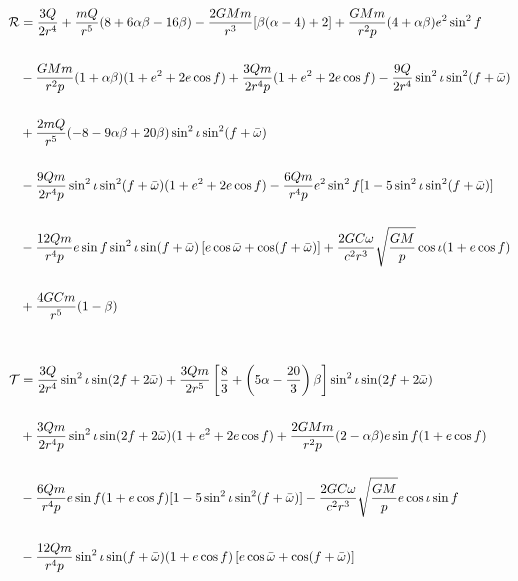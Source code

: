 \begin{align}
\begin{align*}
\mathcal{R} & =  \frac{3Q}{2r^4} +\frac{mQ}{r^5}(8+6\alpha\beta - 16\beta) - \frac{2GMm}{r^3}[\beta(\alpha - 4) + 2]+ \frac{GMm}{r^2p}(4+\alpha\beta) e^2 \sin^2{f}  \notag \\ \notag \\ \notag
&- \frac{GMm}{r^2p}(1+\alpha\beta) (1+e^2+2e\cos f) + \frac{3Qm}{2r^4p}(1+e^2+2e\cos f)- \frac{9Q}{2r^4}\sin^2{\iota} \sin^2(f+\bar\omega)  \\ \notag \\ \notag
& + \frac{2mQ}{r^5}(-8 - 9\alpha\beta + 20\beta) \sin^2{\iota} \sin^2(f+\bar\omega) \\ \notag\\ \notag%
& - \frac{9Qm}{2r^4p}\sin^2{\iota} \sin^2(	f+\bar\omega)(1+e^2+2e\cos f) - \frac{6Qm}{r^4p}e^2\sin^2 f [1-5\sin^2{\iota}\sin^2(f+\bar\omega)] \\ \notag\\ \notag
& - \frac{12Qm}{r^4p}e\sin f \sin^2{\iota}\sin(f+\bar\omega) \left[e\cos \bar\omega + \cos(f+\bar\omega)\right] + \frac{2GC\omega}{c^2 r^3}\sqrt{\frac{GM}{p}}\cos \iota (1+e\cos f) \\ \notag \\ \notag
&+\frac{4GCm}{r^5}(1-\beta) \\ \\ \\ %
\mathcal{T} &= \frac{3Q}{2r^4}\sin^2{\iota}\sin(2f+2\bar\omega) + \frac{3Qm}{2r^5}\left[\frac{8}{3}+\left(5\alpha - \frac{20}{3}\right)\beta\right]\sin^2{\iota}\sin(2f+2\bar\omega)\\ \\
&  + \frac{3Qm}{2r^4p}\sin^2{\iota}\sin(2f+2\bar\omega) (1+e^2+2e\cos f) + \frac{2GMm}{r^2p}(2-\alpha\beta)e\sin f(1+e\cos f)\\ \\
&- \frac{6Qm}{r^4p}e\sin f (1+e\cos f) [1-5\sin^2\iota \sin^2(f+\bar\omega)]- \frac{2GC\omega}{c^2r^3}\sqrt{\frac{GM}{p}} e \cos \iota \sin f  \\ \\
&-\frac{12Qm}{r^4p} \sin^2{\iota}\sin(f+\bar\omega) (1+e\cos f) \left[e\cos \bar\omega + \cos(f+\bar\omega)\right] \\ \\ \\

\end{align*}
\end{align}
